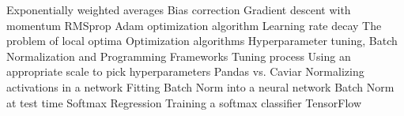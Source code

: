 \documentclass[11pt,a4paper]{moderncv}
\begin{document}
{            Exponentially weighted averages                                                                       %
            Bias correction                                                                                       %
            Gradient descent with momentum                                                                        %
            RMSprop                                                                                               %
            Adam optimization algorithm                                                                           %
            Learning rate decay                                                                                   %
            The problem of local optima                                                                           %
            Optimization algorithms                                                                               %
            Hyperparameter tuning, Batch Normalization and Programming Frameworks                                 %
            Tuning process                                                                                        %
            Using an appropriate scale to pick hyperparameters                                                    %
            Pandas vs. Caviar                                                                                     %
            Normalizing activations in a network                                                                  %
            Fitting Batch Norm into a neural network                                                              %
            Batch Norm at test time                                                                               %
            Softmax Regression                                                                                    %
            Training a softmax classifier                                                                         %
            TensorFlow                                                                                            %
    }
\end{document}
